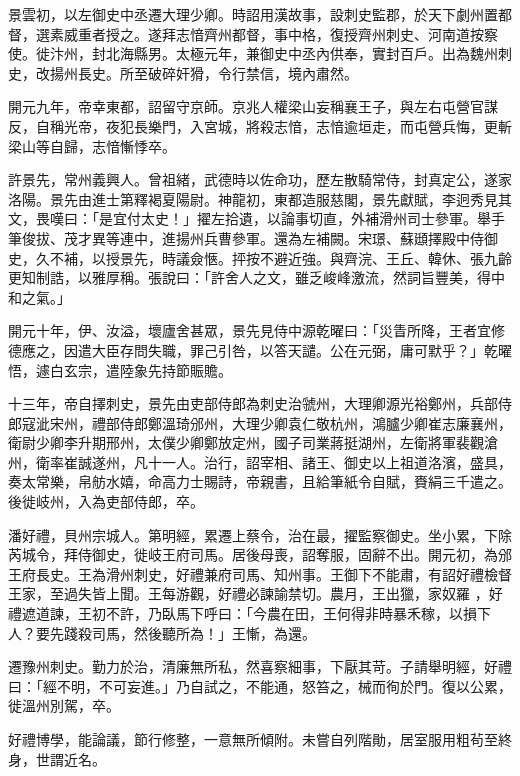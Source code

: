 \begin{pinyinscope}
 景雲初，以左御史中丞遷大理少卿。時詔用漢故事，設刺史監郡，於天下劇州置都督，選素威重者授之。遂拜志愔齊州都督，事中格，復授齊州刺史、河南道按察使。徙汴州，封北海縣男。太極元年，兼御史中丞內供奉，實封百戶。出為魏州刺史，改揚州長史。所至破碎奸猾，令行禁信，境內肅然。



 開元九年，帝幸東都，詔留守京師。京兆人權梁山妄稱襄王子，與左右屯營官謀反，自稱光帝，夜犯長樂門，入宮城，將殺志愔，志愔逾垣走，而屯營兵悔，更斬梁山等自歸，志愔慚悸卒。



 許景先，常州義興人。曾祖緒，武德時以佐命功，歷左散騎常侍，封真定公，遂家洛陽。景先由進士第釋褐夏陽尉。神龍初，東都造服慈閣，景先獻賦，李迥秀見其文，畏嘆曰：「是宜付太史！」擢左拾遺，以論事切直，外補滑州司士參軍。舉手筆俊拔、茂才異等連中，進揚州兵曹參軍。還為左補闕。宋璟、蘇頲擇殿中侍御史，久不補，以授景先，時議僉愜。抨按不避近強。與齊浣、王丘、韓休、張九齡更知制誥，以雅厚稱。張說曰：「許舍人之文，雖乏峻峰激流，然詞旨豐美，得中和之氣。」



 開元十年，伊、汝溢，壞廬舍甚眾，景先見侍中源乾曜曰：「災眚所降，王者宜修德應之，因遣大臣存問失職，罪己引咎，以答天譴。公在元弼，庸可默乎？」乾曜悟，遽白玄宗，遣陸象先持節賑贍。



 十三年，帝自擇刺史，景先由吏部侍郎為刺史治虢州，大理卿源光裕鄭州，兵部侍郎寇泚宋州，禮部侍郎鄭溫琦邠州，大理少卿袁仁敬杭州，鴻臚少卿崔志廉襄州，衛尉少卿李升期邢州，太僕少卿鄭放定州，國子司業蔣挺湖州，左衛將軍裴觀滄州，衛率崔誠遂州，凡十一人。治行，詔宰相、諸王、御史以上祖道洛濱，盛具，奏太常樂，帛舫水嬉，命高力士賜詩，帝親書，且給筆紙令自賦，賚絹三千遣之。後徙岐州，入為吏部侍郎，卒。


潘好禮，貝州宗城人。第明經，累遷上蔡令，治在最，擢監察御史。坐小累，下除芮城令，拜侍御史，徙岐王府司馬。居後母喪，詔奪服，固辭不出。開元初，為邠王府長史。王為滑州刺史，好禮兼府司馬、知州事。王御下不能肅，有詔好禮檢督王家，至過失皆上聞。王每游觀，好禮必諫諭禁切。農月，王出獵，家奴羅
 ，好禮遮道諫，王初不許，乃臥馬下呼曰：「今農在田，王何得非時暴禾稼，以損下人？要先踐殺司馬，然後聽所為！」王慚，為還。



 遷豫州刺史。勤力於治，清廉無所私，然喜察細事，下厭其苛。子請舉明經，好禮曰：「經不明，不可妄進。」乃自試之，不能通，怒笞之，械而徇於門。復以公累，徙溫州別駕，卒。



 好禮博學，能論議，節行修整，一意無所傾附。未嘗自列階勛，居室服用粗茍至終身，世謂近名。




\end{pinyinscope}
